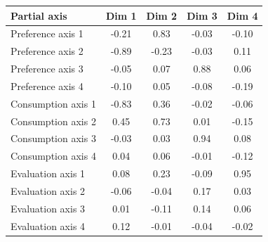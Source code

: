 \begin{tabular}{lcccc}
\toprule
Partial axis & Dim 1 & Dim 2 & Dim 3 & Dim 4 \\
\midrule
Preference axis 1 & -0.21 & 0.83 & -0.03 & -0.10 \\
Preference axis 2 & -0.89 & -0.23 & -0.03 & 0.11 \\
Preference axis 3 & -0.05 & 0.07 & 0.88 & 0.06 \\
Preference axis 4 & -0.10 & 0.05 & -0.08 & -0.19 \\
\addlinespace
Consumption axis 1 & -0.83 & 0.36 & -0.02 & -0.06 \\
Consumption axis 2 & 0.45 & 0.73 & 0.01 & -0.15 \\
Consumption axis 3 & -0.03 & 0.03 & 0.94 & 0.08 \\
Consumption axis 4 & 0.04 & 0.06 & -0.01 & -0.12 \\
\addlinespace
Evaluation axis 1 & 0.08 & 0.23 & -0.09 & 0.95 \\
Evaluation axis 2 & -0.06 & -0.04 & 0.17 & 0.03 \\
Evaluation axis 3 & 0.01 & -0.11 & 0.14 & 0.06 \\
Evaluation axis 4 & 0.12 & -0.01 & -0.04 & -0.02 \\
\bottomrule
\end{tabular}
